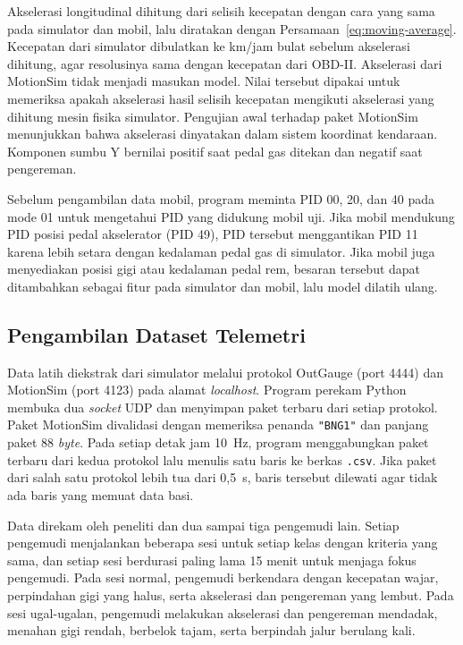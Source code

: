 Akselerasi longitudinal dihitung dari selisih kecepatan dengan cara yang sama pada simulator dan mobil, lalu diratakan dengan Persamaan~\ref{eq:moving-average}. Kecepatan dari simulator dibulatkan ke km/jam bulat sebelum akselerasi dihitung, agar resolusinya sama dengan kecepatan dari OBD-II. Akselerasi dari MotionSim tidak menjadi masukan model. Nilai tersebut dipakai untuk memeriksa apakah akselerasi hasil selisih kecepatan mengikuti akselerasi yang dihitung mesin fisika simulator. Pengujian awal terhadap paket MotionSim menunjukkan bahwa akselerasi dinyatakan dalam sistem koordinat kendaraan. Komponen sumbu Y bernilai positif saat pedal gas ditekan dan negatif saat pengereman.

Sebelum pengambilan data mobil, program meminta PID 00, 20, dan 40 pada mode 01 untuk mengetahui PID yang didukung mobil uji. Jika mobil mendukung PID posisi pedal akselerator (PID 49), PID tersebut menggantikan PID 11 karena lebih setara dengan kedalaman pedal gas di simulator. Jika mobil juga menyediakan posisi gigi atau kedalaman pedal rem, besaran tersebut dapat ditambahkan sebagai fitur pada simulator dan mobil, lalu model dilatih ulang.

\subsection{Pengambilan Dataset Telemetri}
Data latih diekstrak dari simulator melalui protokol OutGauge (port 4444) dan MotionSim (port 4123) pada alamat \textit{localhost}. Program perekam Python membuka dua \textit{socket} UDP dan menyimpan paket terbaru dari setiap protokol. Paket MotionSim divalidasi dengan memeriksa penanda \texttt{"BNG1"} dan panjang paket 88 \textit{byte}. Pada setiap detak jam 10~Hz, program menggabungkan paket terbaru dari kedua protokol lalu menulis satu baris ke berkas \texttt{.csv}. Jika paket dari salah satu protokol lebih tua dari 0,5~s, baris tersebut dilewati agar tidak ada baris yang memuat data basi.

Data direkam oleh peneliti dan dua sampai tiga pengemudi lain. Setiap pengemudi menjalankan beberapa sesi untuk setiap kelas dengan kriteria yang sama, dan setiap sesi berdurasi paling lama 15 menit untuk menjaga fokus pengemudi. Pada sesi normal, pengemudi berkendara dengan kecepatan wajar, perpindahan gigi yang halus, serta akselerasi dan pengereman yang lembut. Pada sesi ugal-ugalan, pengemudi melakukan akselerasi dan pengereman mendadak, menahan gigi rendah, berbelok tajam, serta berpindah jalur berulang kali.

